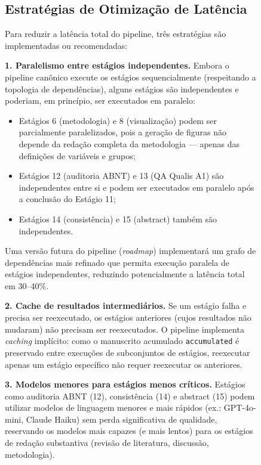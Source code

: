 \begin{figure}
\subsection{Estratégias de Otimização de Latência}
\label{sec:otimizacao}

Para reduzir a latência total do pipeline, três estratégias são
implementadas ou recomendadas:

\textbf{1. Paralelismo entre estágios independentes.} Embora o
pipeline canônico execute os estágios sequencialmente (respeitando
a topologia de dependências), alguns estágios são independentes e
poderiam, em princípio, ser executados em paralelo:

\begin{itemize}
    \item Estágios 6 (metodologia) e 8 (visualização) podem ser
    parcialmente paralelizados, pois a geração de figuras não
    depende da redação completa da metodologia — apenas das
    definições de variáveis e grupos;

    \item Estágios 12 (auditoria ABNT) e 13 (QA Qualis A1) são
    independentes entre si e podem ser executados em paralelo após
    a conclusão do Estágio 11;

    \item Estágios 14 (consistência) e 15 (abstract) também são
    independentes.
\end{itemize}

Uma versão futura do pipeline (\textit{roadmap}) implementará um
grafo de dependências mais refinado que permita execução paralela
de estágios independentes, reduzindo potencialmente a latência
total em 30--40\%.

\textbf{2. Cache de resultados intermediários.} Se um estágio falha
e precisa ser reexecutado, os estágios anteriores (cujos resultados
não mudaram) não precisam ser reexecutados. O pipeline implementa
\textit{caching} implícito: como o manuscrito acumulado
\texttt{accumulated} é preservado entre execuções de subconjuntos
de estágios, reexecutar apenas um estágio específico não requer
reexecutar os anteriores.

\textbf{3. Modelos menores para estágios menos críticos.}
Estágios como auditoria ABNT (12), consistência (14) e abstract
(15) podem utilizar modelos de linguagem menores e mais rápidos
(ex.: GPT-4o-mini, Claude Haiku) sem perda significativa de
qualidade, reservando os modelos mais capazes (e mais lentos) para
os estágios de redação substantiva (revisão de literatura,
discussão, metodologia).


\end{figure}

